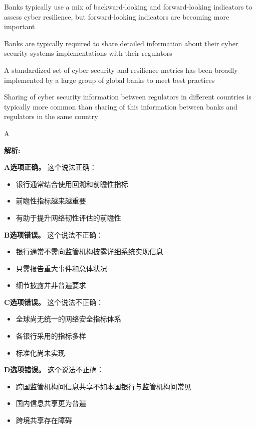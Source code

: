 \documentclass{article}
\newenvironment{explanation}
{\textbf{解析:}\par}
{\par}
\begin{document}
\begin{choices}
    \item Banks typically use a mix of backward-looking and forward-looking indicators to assess cyber resilience, but forward-looking indicators are becoming more important
    \item Banks are typically required to share detailed information about their cyber security systems implementations with their regulators
    \item A standardized set of cyber security and resilience metrics has been broadly implemented by a large group of global banks to meet best practices
    \item Sharing of cyber security information between regulators in different countries is typically more common than sharing of this information between banks and regulators in the same country
\end{choices}

\begin{correctanswer}
    A
\end{correctanswer}

\begin{explanation}
    \textbf{A选项正确。}
    这个说法正确：
    \begin{itemize}
        \item 银行通常结合使用回溯和前瞻性指标
        \item 前瞻性指标越来越重要
        \item 有助于提升网络韧性评估的前瞻性
    \end{itemize}

    \textbf{B选项错误。}
    这个说法不正确：
    \begin{itemize}
        \item 银行通常不需向监管机构披露详细系统实现信息
        \item 只需报告重大事件和总体状况
        \item 细节披露并非普遍要求
    \end{itemize}

    \textbf{C选项错误。}
    这个说法不正确：
    \begin{itemize}
        \item 全球尚无统一的网络安全指标体系
        \item 各银行采用的指标多样
        \item 标准化尚未实现
    \end{itemize}

    \textbf{D选项错误。}
    这个说法不正确：
    \begin{itemize}
        \item 跨国监管机构间信息共享不如本国银行与监管机构间常见
        \item 国内信息共享更为普遍
        \item 跨境共享存在障碍
    \end{itemize}
\end{explanation}
\end{document}
